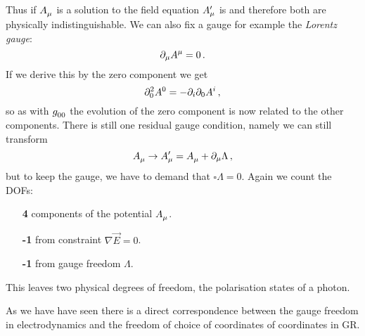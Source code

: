 Thus if $\tensor{A}{_\mu}$ is a solution to the field
equation $\tensor*{A}{*_\mu^\prime}$ is and therefore both are physically
indistinguishable. We can also fix a gauge for example the \emph{Lorentz gauge}:
\begin{equation}
\partial_\mu\tensor{A}{^\mu}=0\, .
\end{equation}
If we derive this by the zero component we get
\begin{equation}
\partial_{0}^2\tensor{A}{^0}=-\partial_i\partial_0\tensor{A}{^i}\, ,
\end{equation}
so as with $\tensor{g}{_0_0}$ the evolution of the zero component is now related
to the other components. There is still one residual gauge condition, namely we can
still transform
\begin{equation}
\tensor{A}{_\mu}\to\tensor*{A}{*_\mu^\prime}=
\tensor{A}{_\mu}+\partial_\mu\Lambda\, ,
\end{equation}
but to keep the gauge, we have to demand that $\square\Lambda=0$.
Again we count the DOFs:
\begin{itemize}
  \item[\textsf{\textbf{4}}] components of the potential
  $\tensor{A}{_\mu}$.
  \item[\textsf{\textbf{-1}}] from constraint
  $\nabla\vec{E}=0$.
  \item[\textsf{\textbf{-1}}] from gauge freedom
  $\Lambda$.
\end{itemize}
This leaves two physical degrees of freedom, the polarisation states of a
photon.
\begin{remark}
As we have have seen there is a direct correspondence between the gauge freedom
in electrodynamics and the freedom of choice of coordinates of coordinates in
GR.
\end{remark}
